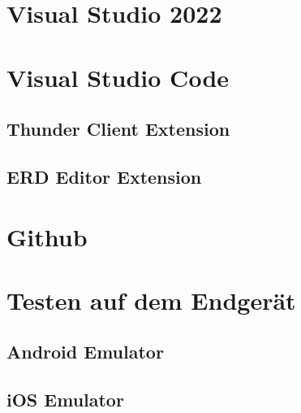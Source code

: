 \section{Visual Studio 2022}
\author{unknown}
\lipsum[10-15]

\section{Visual Studio Code}
\author{unknown}
\lipsum[10-15]

\subsection{Thunder Client Extension}
\author{Stefano Pyringer}
\lipsum[5-10]

\subsection{ERD Editor Extension}
\author{Stefano Pyringer}
\lipsum[5-10]

\section{Github}
\author{unknown}
\lipsum[10-15]

\section{Testen auf dem Endgerät}
\subsection{Android Emulator}
\subsection{iOS Emulator}